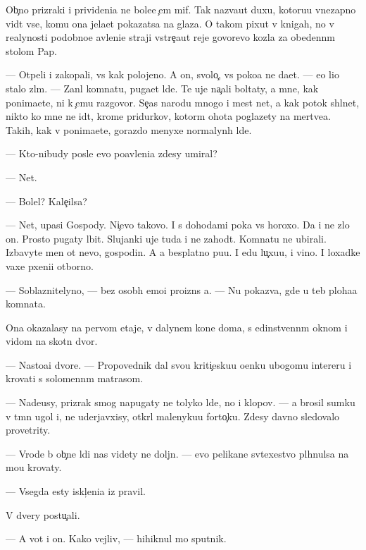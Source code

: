 \documentclass[10pt]{book}
\begin{document}
Ob{\yi}{\c}no prizraki i privideni{\y}a ne bole{\y}e {\c}em mif. Tak naz{\yi}va{\y}ut duxu, kotoru{\y}u vnezapno vid{\ia}t vse, komu ona jela{\y}et pokazatsa na glaza. O takom pixut v knigah, no v realynosti podobno{\y}e {\y}avleni{\y}e straji vstre{\c}a{\y}ut reje govor{\ia}{\x}evo kozla za obedenn{\yi}m stolom Pap{\yi}.

— Otpeli i zakopali, vs{\e} kak polojeno. A on, svolo{\c}, vs{\e} poko{\y}a ne da{\y}et. — {\y}e{\y}o li{\q}o stalo zl{\yi}m. — Zan{\ia}l komnatu, puga{\y}et l{\iu}de{\y}. Te uje na{\c}ali boltaty, a mne, kak ponima{\y}ete, ni k {\c}emu razgovor{\yi}. Se{\y}{\c}as narodu mnogo i mest net, a kak potok shl{\yi}net, nikto ko mne ne id{\e}t, krome pridurkov, kotor{\yi}m ohota poglazety na mertve{\q}a. Takih, kak v{\yi} ponima{\y}ete, gorazdo menyxe normalyn{\yi}h l{\iu}de{\y}.

— Kto-nibudy posle {\y}evo po{\y}avleni{\y}a zdesy umiral?

— Net.

— Bolel? Kale{\c}ilsa?

— Net, upasi Gospody. Ni{\c}evo takovo. I s dohodami poka vs{\e} horoxo. Da i ne zlo{\y} on. Prosto pugaty l{\iu}bit. Slujanki uje tuda i ne zahod{\ia}t. Komnatu ne ubirali. Izbavyte men{\ia} ot nevo, gospodin. A {\y}a besplatno pu{\x}u. I {\y}edu lu{\c}xu{\y}u, i vino. I loxadke vaxe{\y} pxeni{\q}i otborno{\y}.

— Soblaznitelyno, — bez osob{\yi}h emo{\q}i{\y} proizn{\e}s {\y}a. — Nu pokaz{\yi}va{\y}, gde u teb{\ia} ploha{\y}a komnata.

Ona okazalasy na pervom etaje, v dalynem kon{\q}e doma, s {\y}edinstvenn{\yi}m oknom i vidom na skotn{\yi}{\y} dvor.

— Nasto{\y}a{\x}i{\y} dvore{\q}. — Propovednik dal svo{\y}u kriti{\c}esku{\y}u o{\q}enku ubogomu inter{\y}eru i krovati s solomenn{\yi}m matrasom.

— Nade{\y}usy, prizrak smog napugaty ne tolyko l{\iu}de{\y}, no i klopov. — {\Y}a brosil sumku v t{\e}mn{\yi}{\y} ugol i, ne uderjavxisy, otkr{\yi}l malenyku{\y}u forto{\c}ku. Zdesy davno sledovalo provetrity.

— Vrode b{\yi} ob{\yi}{\c}n{\yi}{\y}e l{\iu}di nas videty ne doljn{\yi}. — {\Y}evo pelikan{\y}e sv{\ia}te{\y}xestvo pl{\iu}hnulsa na mo{\y}u krovaty.

— Vsegda {\y}esty iskl{\iu}{\c}eni{\y}a iz pravil.

V dvery postu{\c}ali.

— A vot i on. Kako{\y} vejliv{\yi}{\y}, — hihiknul mo{\y} sputnik.
\end{document}
